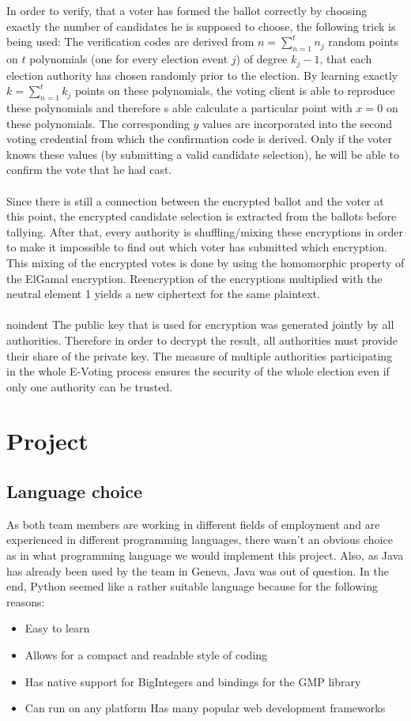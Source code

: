 \documentclass[a4paper,12pt]{report}
\theoremstyle{definition}
\begin{document}
\\\\\noindent In order to verify, that a voter has formed the ballot correctly by choosing exactly the number of candidates he is supposed to choose, the following trick is being used: The verification codes are derived from $n = \sum_{n=1}^{t} n_j$ random points on $t$ polynomials (one for every election event $j$) of degree $k_j - 1$, that each election authority has chosen randomly prior to the election. By learning exactly $k = \sum_{n=1}^{t} k_j$ points on these polynomials, the voting client is able to reproduce these polynomials and therefore s able calculate a particular point with $x=0$ on these polynomials. The corresponding $y$ values are incorporated into the second voting credential from which the confirmation code is derived. Only if the voter knows these values (by submitting a valid candidate selection), he will be able to confirm the vote that he had cast.
\\\\\noindent Since there is still a connection between the encrypted ballot and the voter at this point, the encrypted candidate selection is extracted from the ballots before tallying. After that, every authority is shuffling/mixing these encryptions in order to make it impossible to find out which voter has submitted which encryption. This mixing of the encrypted votes is done by using the homomorphic property of the ElGamal encryption. Reencryption of the encryptions multiplied with the neutral element 1 yields a new ciphertext for the same plaintext.
\\\\noindent The public key that is used for encryption was generated jointly by all authorities. Therefore in order to decrypt the result, all authorities must provide their share of the private key. The measure of multiple authorities participating in the whole E-Voting process ensures the security of the whole election even if only one authority can be trusted.
\chapter{Project}
\section{Language choice}
As both team members are working in different fields of employment and are experienced in different programming languages, there wasn't an obvious choice as in what programming language we would implement this project. Also, as Java has already been used by the team in Geneva, Java was out of question. In the end, Python seemed like a rather suitable language because for the following reasons:
\begin{itemize}
	\item Easy to learn
	\item Allows for a compact and readable style of coding
	\item Has native support for BigIntegers and bindings for the GMP library
	\item Can run on any platform
	\items Has many popular web development frameworks
\end{itemize}
\end{document}

